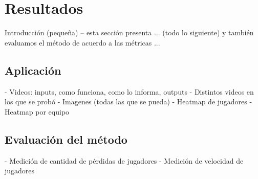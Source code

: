 \section{Resultados}
\label{sec:resultados}

Introducción (pequeña) -- esta sección presenta ... (todo lo siguiente) y también evaluamos el método de acuerdo a las métricas ...

\subsection{Aplicación}
  - Videos: inputs, como funciona, como lo informa, outputs
  - Distintos videos en los que se probó
  - Imagenes (todas las que se pueda)
  - Heatmap de jugadores
  - Heatmap por equipo

\subsection{Evaluación del método}
  - Medición de cantidad de pérdidas de jugadores
  - Medición de velocidad de jugadores
